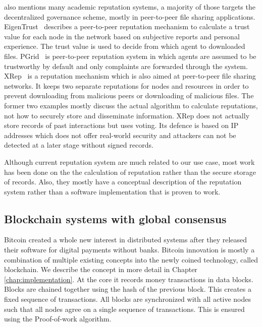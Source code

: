 \cite{HENDRIKX2015184} also mentions many academic reputation systems, a majority of those targets 
the decentralized governance scheme, mostly in peer-to-peer file sharing applications. 
EigenTrust~\cite{kamvar2003eigentrust} describes a peer-to-peer reputation mechanism to calculate a trust value for each 
node in the network based on subjective reports and personal experience. The trust value is used 
to decide from which agent to downloaded files. PGrid~\cite{aberer2003p} is peer-to-peer reputation
system in which agents are assumed to be trustworthy by default and only complaints are forwarded 
through the system. XRep~\cite{damiani2002xrep} is a reputation mechanism which is also aimed at 
peer-to-peer file sharing networks. It keeps two separate reputations for nodes and resources in
order to prevent downloading from malicious peers or downloading of malicious files. The former two
examples mostly discuss the actual algorithm to calculate reputations, not how to securely store and
disseminate information. XRep does not actually store records of past interactions but uses voting.
Its defence is based on IP addresses which does not offer real-world security and attackers can not
be detected at a later stage without signed records.

Although current reputation system are much related to our use case, most work has been done on the 
the calculation of reputation rather than the secure storage of records. Also, they mostly have a
conceptual description of the reputation system rather than a software implementation that is proven
to work.

\subsection{Blockchain systems with global consensus}
Bitcoin\cite{nakamoto2008bitcoin} created a whole new interest in distributed systems after they 
released their software for digital payments without banks. Bitcoin innovation is mostly a combination of
multiple existing concepts into the newly coined technology, called blockchain. We describe the 
concept in more detail in Chapter \ref{chap:implementation}. At the core it records money transactions
in data blocks. Blocks are chained together using the hash of the previous block. This creates a 
fixed sequence of transactions. All blocks are synchronized with all active nodes such that all nodes
agree on a single sequence of transactions. This is ensured using the Proof-of-work algorithm.

